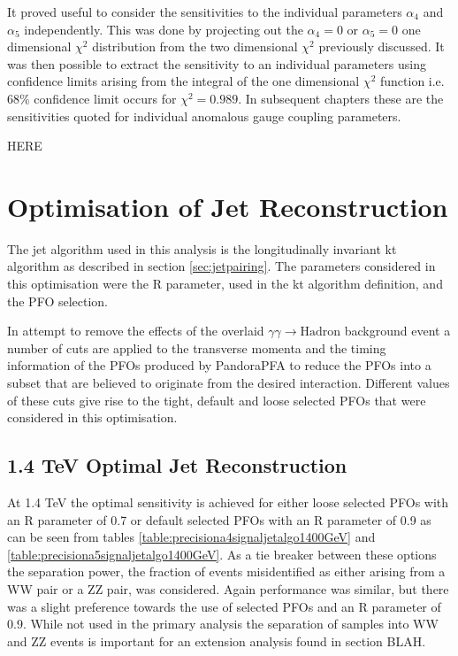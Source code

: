 It proved useful to consider the sensitivities to the individual parameters $\alpha_{4}$ and $\alpha_{5}$ independently.  This was done by projecting out the $\alpha_{4} = 0$ or $\alpha_{5} = 0$ one dimensional $\chi^{2}$ distribution from the two dimensional $\chi^{2}$ previously discussed.  It was then possible to extract the sensitivity to an individual parameters using confidence limits arising from the integral of the one dimensional $\chi^{2}$ function i.e. 68\% confidence limit occurs for $\chi^{2} = 0.989$.  In subsequent chapters these are the sensitivities quoted for individual anomalous gauge coupling parameters. 

HERE

\section{Optimisation of Jet Reconstruction} \label{sec:optimisationjetalgo}
The jet algorithm used in this analysis is the longitudinally invariant kt algorithm as described in section \ref{sec:jetpairing}.  The parameters considered in this optimisation were the R parameter, used in the kt algorithm definition, and the PFO selection.  

In attempt to remove the effects of the overlaid $\gamma\gamma \rightarrow \text{Hadron}$ background event a number of cuts \cite{arXiv:1209.4039} are applied to the transverse momenta and the timing information of the PFOs produced by PandoraPFA to reduce the PFOs into a subset that are believed to originate from the desired interaction.  Different values of these cuts give rise to the tight, default and loose selected PFOs that were considered in this optimisation.  



\subsection{1.4 TeV Optimal Jet Reconstruction}


At 1.4 TeV the optimal sensitivity is achieved for either loose selected PFOs with an R parameter of 0.7 or default selected PFOs with an R parameter of 0.9 as can be seen from tables \ref{table:precisiona4signaljetalgo1400GeV} and \ref{table:precisiona5signaljetalgo1400GeV}.  As a tie breaker between these options the separation power, the fraction of events misidentified as either arising from a WW pair or a ZZ pair, was considered.  Again performance was similar, but there was a slight preference towards the use of selected PFOs and an R parameter of 0.9.  While not used in the primary analysis the separation of samples into WW and ZZ events is important for an extension analysis found in section BLAH.  


